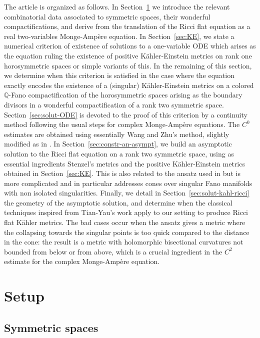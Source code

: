 \documentclass[10pt]{amsart}
\theoremstyle{plain}
\theoremstyle{definition}
\begin{document}
The article is organized as follows. In Section~\ref{sec:setup} we
introduce the relevant combinatorial data associated to symmetric
spaces, their wonderful compactifications, and derive from
\cite{DelHoro} the translation of the Ricci flat equation as a real
two-variables Monge-Ampère equation. In Section~\ref{sec:KE}, we state
a numerical criterion of existence of solutions to a one-variable ODE
which arises as the equation ruling the existence of positive
Kähler-Einstein metrics on rank one horosymmetric spaces or simple
variants of this. In the remaining of this section, we determine when
this criterion is satisfied in the case where the equation exactly
encodes the existence of a (singular) Kähler-Einstein metrics on a
colored $\mathbb{Q}$-Fano compactification of the horosymmetric spaces
arising as the boundary divisors in a wonderful compactification of a
rank two symmetric space. Section~\ref{sec:solut-ODE} is devoted to
the proof of this criterion by a continuity method following the usual
steps for complex Monge-Ampère equations. The $C^0$ estimates are
obtained using essentially Wang and Zhu's method, slightly modified as
in \cite{DelKE}. In Section~\ref{sec:constr-an-asympt}, we build an
asymptotic solution to the Ricci flat equation on a rank two symmetric
space, using as essential ingredients Stenzel's metrics and the
positive Kähler-Einstein metrics obtained in
Section~\ref{sec:KE}. This is also related to the ansatz used in
\cite{CDR16,Li17,Sze17} but is more complicated and in particular
addresses cones over singular Fano manifolds with non isolated
singularities. Finally, we detail in
Section~\ref{sec:solut-kahl-ricci} the geometry of the asymptotic
solution, and determine when the classical techniques inspired from
Tian-Yau's work apply to our setting to produce Ricci flat Kähler
metrics. The bad cases occur when the ansatz gives a metric where the collapsing towards the singular points is too quick compared to the distance in the cone: the result is a metric with holomorphic bisectional curvatures not bounded from below or from above, which is a crucial ingredient in the $C^2$ estimate for the complex Monge-Ampère equation.

\section{Setup}
\label{sec:setup}

\subsection{Symmetric spaces}
\end{document}

